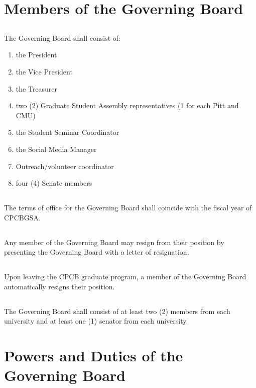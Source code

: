 \documentclass[11pt,a4paper]{article}
\begin{document}
\section{Members of the Governing Board}\label{article:5}

\subsection{}The Governing Board shall consist of:
\begin{enumerate}
	\item the President
	\item the Vice President
	\item the Treasurer
	\item two (2) Graduate Student Assembly representatives (1 for each Pitt and CMU)
    \item the Student Seminar Coordinator
	\item the Social Media Manager
	\item Outreach/volunteer coordinator
	\item four (4) Senate members
\end{enumerate}

\subsection{}The terms of office for the Governing Board shall coincide with the fiscal year of CPCBGSA.

\subsection{}Any member of the Governing Board may resign from their position by presenting the Governing Board with a letter of resignation.

\subsection{}Upon leaving the CPCB graduate program, a member of the Governing Board automatically resigns their position.
 
\subsection{}The Governing Board shall consist of at least two (2) members from each university and at least one (1) senator from each university.

\section{Powers and Duties of the Governing Board}\label{article:6}
\end{document}
